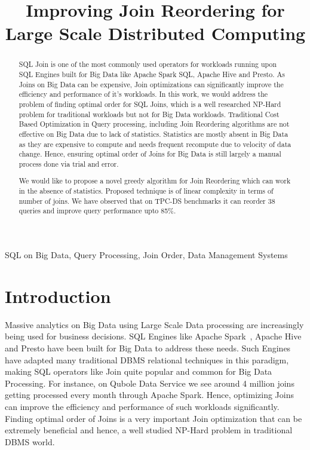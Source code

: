 \documentclass[conference]{IEEEtran}
\begin{document}
\title{Improving Join Reordering for Large Scale Distributed Computing\\
}

\author{
\and
{}
}

\maketitle

\begin{abstract}
 SQL Join is one of the most commonly used operators for workloads running upon SQL Engines built for Big Data like Apache Spark SQL, Apache Hive and Presto. As Joins on Big Data can be expensive, Join optimizations can significantly improve the efficiency and performance of it's workloads. In this work, we would address the problem of finding optimal order for SQL Joins, which is a well researched NP-Hard problem for traditional workloads but not for Big Data workloads. Traditional Cost Based Optimization in Query processing, including Join Reordering algorithms are not effective on Big Data due to lack of statistics. Statistics are mostly absent in Big Data as they are expensive to compute and needs frequent recompute due to velocity of data change. Hence, ensuring optimal order of Joins for Big Data is still largely a manual process done via trial and error.

We would like to propose a novel greedy algorithm for Join Reordering which can work in the absence of statistics. Proposed technique is of linear complexity in terms of number of joins. We have observed that on TPC-DS benchmarks it can reorder 38 queries and improve query performance upto 85\%.
\end{abstract}

\begin{IEEEkeywords}
SQL on Big Data, Query Processing, Join Order, Data Management Systems
\end{IEEEkeywords}

\section{Introduction}
Massive analytics on Big Data using Large Scale Data processing are increasingly being used for business decisions. SQL Engines like Apache Spark~\cite{b9}, Apache Hive~\cite{b10} and Presto have been built for Big Data to address these needs. Such Engines have adapted many traditional DBMS relational techniques in this paradigm, making SQL operators like Join quite popular and common for Big Data Processing. For instance, on Qubole Data Service we see around 4 million joins getting processed every month through Apache Spark. Hence, optimizing Joins can improve the efficiency and performance of such workloads significantly. Finding optimal order of Joins is a very important Join optimization that can be extremely beneficial and hence, a well studied NP-Hard problem in traditional DBMS world.
\end{document}
